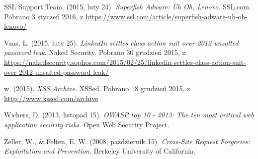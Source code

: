 \documentclass[12pt,polish,a4paper,]{report}
\begin{document}
\hypertarget{ref-superfishux5fssl}{}
SSL Support Team. (2015, luty 24). \emph{Superfish Adware: Uh Oh,
Lenovo}. SSL.com. Pobrano 3 styczeń 2016, z
\url{https://www.ssl.com/article/superfish-adware-uh-oh-lenovo/}

\hypertarget{ref-linkedinux5fbreach}{}
Vaas, L. (2015, luty 25). \emph{LinkedIn settles class action suit over
2012 unsalted password leak}. Naked Security. Pobrano 30 grudzień 2015,
z
\url{https://nakedsecurity.sophos.com/2015/02/25/linkedin-settles-class-action-suit-over-2012-unsalted-password-leak/}

\hypertarget{ref-xssed}{}
w. (2015). \emph{XSS Archive}. XSSed. Pobrano 18 grudzień 2015, z
\url{http://www.xssed.com/archive}

\hypertarget{ref-owaspux5ftopux5ften}{}
Wichers, D. (2013, listopad 15). \emph{OWASP top 10 - 2013: The ten most
critical web application security risks}. Open Web Security Project.

\hypertarget{ref-csrfux5fexamples}{}
Zeller, W., \& Felten, E. W. (2008, październik 15). \emph{Cross-Site
Request Forgeries: Exploitation and Prevention}. Berkeley University of
California.
\end{document}
